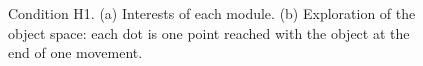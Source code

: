 \documentclass[10pt,letterpaper]{article}
\begin{document}
	\begin{figure}[ht]
		\centering
		\caption{Condition H1. (a) Interests of each module. (b) Exploration of the object space: each dot is one point reached with the object at the end of one movement.}
		\label{res_interests}
	\end{figure}
\end{document}
